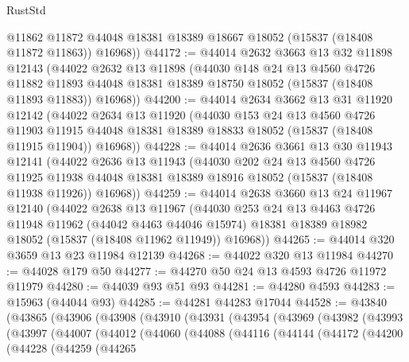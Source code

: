 \begin{lexlean}{RustStd}
\begin{coremodule}
        @11862
        @11872
        @44048
        @18381
        @18389
        @18667
        @18052
        (@15837 (@18408 @11872 @11863))
        @16968))
@44172 := @44014
    @2632
    @3663
    @13
    @32
    @11898
    @12143
    (@44022
      @2632
      @13
      @11898
      (@44030
        @148
        @24
        @13
        @4560
        @4726
        @11882
        @11893
        @44048
        @18381
        @18389
        @18750
        @18052
        (@15837 (@18408 @11893 @11883))
        @16968))
@44200 := @44014
    @2634
    @3662
    @13
    @31
    @11920
    @12142
    (@44022
      @2634
      @13
      @11920
      (@44030
        @153
        @24
        @13
        @4560
        @4726
        @11903
        @11915
        @44048
        @18381
        @18389
        @18833
        @18052
        (@15837 (@18408 @11915 @11904))
        @16968))
@44228 := @44014
    @2636
    @3661
    @13
    @30
    @11943
    @12141
    (@44022
      @2636
      @13
      @11943
      (@44030
        @202
        @24
        @13
        @4560
        @4726
        @11925
        @11938
        @44048
        @18381
        @18389
        @18916
        @18052
        (@15837 (@18408 @11938 @11926))
        @16968))
@44259 := @44014
    @2638
    @3660
    @13
    @24
    @11967
    @12140
    (@44022
      @2638
      @13
      @11967
      (@44030
        @253
        @24
        @13
        @4463
        @4726
        @11948
        @11962
        (@44042 @4463 @44046 @15974)
        @18381
        @18389
        @18982
        @18052
        (@15837 (@18408 @11962 @11949))
        @16968))
@44265 := @44014 @320 @3659 @13 @23 @11984 @12139
@44268 := @44022 @320 @13 @11984
@44270 := @44028 @179 @50
@44277 := @44270 @50 @24 @13 @4593 @4726 @11972 @11979
@44280 := @44039 @93 @51 @93
@44281 := @44280 @4593
@44283 := @15963 (@44044 @93)
@44285 := @44281 @44283 @17044
@44528 := @43840
    (@43865
      (@43906
        (@43908
          (@43910
            (@43931
              (@43954
                (@43969
                  (@43982
                    (@43993
                      (@43997
                        (@44007
                          (@44012
                            (@44060
                              (@44088
                                (@44116
                                  (@44144
                                    (@44172
                                      (@44200
                                        (@44228
                                          (@44259
                                            (@44265

\end{coremodule}
\end{lexlean}

